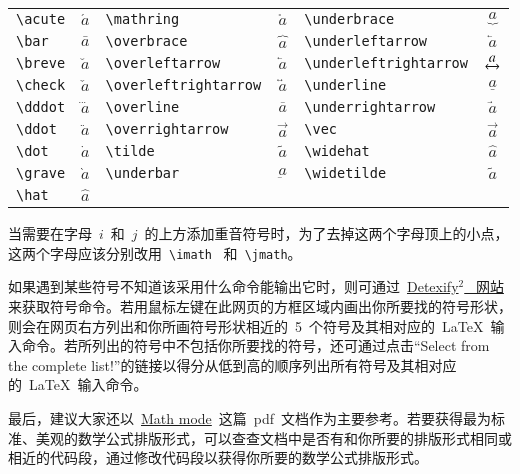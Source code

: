 \vspace{0.5em}\noindent\wuhao\begin{tabularx}{\textwidth}{Xc|Xc|Xc}
 \verb|\acute| & $\acute{a}$ & \verb|\mathring| & $\mathring{a}$ & \verb|\underbrace| & $\underbrace{a}$ \\
 \verb|\bar| & $\bar{a}$ & \verb|\overbrace| & $\overbrace{a}$ & \verb|\underleftarrow| & $\underleftarrow{a}$ \\
 \verb|\breve| & $\breve{a}$ & \verb|\overleftarrow| & $\overleftarrow{a}$ & \verb|\underleftrightarrow| & $\underleftrightarrow{a}$ \\
 \verb|\check| & $\check{a}$ & \verb|\overleftrightarrow| & $\overleftrightarrow{a}$ & \verb|\underline| & $\underline{a}$ \\
 \verb|\dddot| & $\dddot{a}$ & \verb|\overline| & $\overline{a}$ & \verb|\underrightarrow| & $\underrightarrow{a}$ \\
 \verb|\ddot| & $\ddot{a}$ & \verb|\overrightarrow| & $\overrightarrow{a}$ & \verb|\vec| & $\vec{a}$ \\
 \verb|\dot| & $\dot{a}$ & \verb|\tilde| & $\tilde{a}$ & \verb|\widehat| & $\widehat{a}$ \\
 \verb|\grave| & $\grave{a}$ & \verb|\underbar| & $\underbar{a}$ & \verb|\widetilde| & $\widetilde{a}$ \\
 \verb|\hat| & $\hat{a}$
\end{tabularx}\vspace{0.5em}

\xiaosi 当需要在字母~$i$~和~$j$~的上方添加重音符号时，为了去掉这两个字母顶上的小点，这两个字母应该分别改用~\verb|\imath|~ 和~\verb|\jmath|。

如果遇到某些符号不知道该采用什么命令能输出它时，则可通过~\href{http://detexify.kirelabs.org/classify.html}{Detexify$^2$~ 网站}来获取符号命令。若用鼠标左键在此网页的方框区域内画出你所要找的符号形状，则会在网页右方列出和你所画符号形状相近的~5~个符号及其相对应的~\LaTeX~输入命令。若所列出的符号中不包括你所要找的符号，还可通过点击“Select from the complete list!”的链接以得分从低到高的顺序列出所有符号及其相对应的~\LaTeX~输入命令。

最后，建议大家还以~\href{http://tug.ctan.org/cgi-bin/ctanPackageInformation.py?id=voss-mathmode}{Math mode}~这篇~pdf~文档作为主要参考。若要获得最为标准、美观的数学公式排版形式，可以查查文档中是否有和你所要的排版形式相同或相近的代码段，通过修改代码段以获得你所要的数学公式排版形式。

